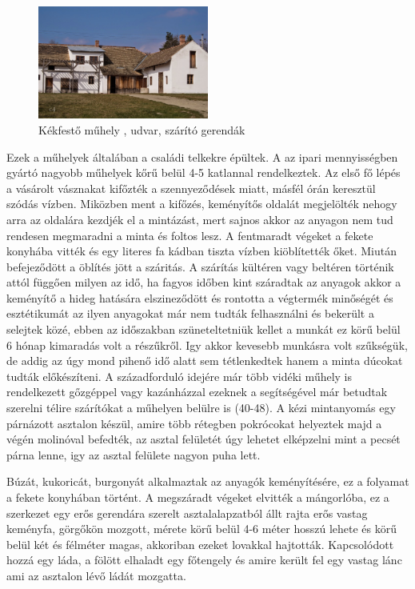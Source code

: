 \documentclass[fontsize=12pt, appendixprefix=true]{scrreprt}
\begin{document}
\begin{figure}[h!]
	\centering
	\includegraphics[width=0.5\textwidth]{img/udvar.jpg}
	\caption{Kékfestő műhely , udvar, szárító gerendák}
	\label{fig:udvar}
\end{figure}

Ezek a műhelyek általában a családi telkekre épültek. A az ipari mennyisségben gyártó nagyobb műhelyek kőrű belül 4-5 katlannal rendelkeztek. Az első fő lépés a vásárolt vásznakat kifőzték a szennyeződések miatt, másfél órán keresztül szódás vízben. Miközben ment a kifőzés, keményítős oldalát megjelölték nehogy arra az oldalára kezdjék el a mintázást, mert sajnos akkor az anyagon nem tud rendesen megmaradni a minta és foltos lesz. A  fentmaradt végeket a fekete konyhába vitték és egy literes fa kádban tiszta vízben kiöblítették őket. Miután befejeződött a öblítés jött a száritás. A szárítás kültéren vagy beltéren történik attól függően milyen az idő, ha fagyos időben kint száradtak az anyagok akkor a keményítő a hideg hatására elszineződött és rontotta a végtermék minőségét és esztétikumát az ilyen anyagokat már nem tudták felhasználni és bekerült a selejtek közé, ebben az időszakban szüneteltetniük kellet a munkát ez körű belül 6 hónap kimaradás volt a részűkről. Igy akkor kevesebb munkásra volt szűkségük, de addig az úgy mond pihenő idő alatt sem tétlenkedtek hanem a minta dúcokat tudták előkészíteni.
A századforduló idejére már több vidéki műhely is rendelkezett gőzgéppel vagy kazánházzal ezeknek a segítségével már betudtak szerelni télire szárítókat a műhelyen belülre is \cite{domonkos1981magyarorszagi}(40-48).
A kézi mintanyomás egy párnázott asztalon készül, amire több rétegben pokrócokat helyeztek majd a végén molinóval befedték, az asztal felületét úgy lehetet elképzelni mint a pecsét párna lenne, igy az asztal felülete nagyon puha lett.

Búzát, kukoricát, burgonyát alkalmaztak az anyagók keményítésére, ez a folyamat a fekete konyhában történt. A megszáradt végeket elvitték a mángorlóba, ez a szerkezet  egy erős gerendára szerelt asztalalapzatból állt rajta erős vastag keményfa, görgőkön mozgott, mérete körű belül 4-6 méter hosszú lehete és körű belül két és félméter magas, akkoriban ezeket lovakkal hajtották. Kapcsolódott hozzá egy láda, a fölött elhaladt egy főtengely és amire került fel egy vastag lánc ami az asztalon lévő ládát mozgatta.
\end{document}
